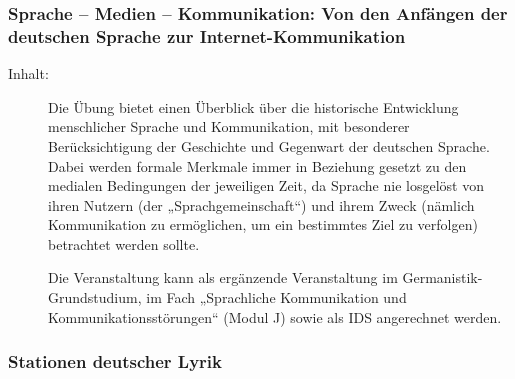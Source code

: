 \documentclass[%
a4paper, %
11pt,               %
leqno,              %
fleqn,              %
]
{scrartcl}
\begin{document}

\subsubsection{Sprache -- Medien -- Kommunikation: Von den Anfängen der
deutschen Sprache zur Internet-Kommunikation} %
\label{ssub:Sprache -- Medien -- Kommunikation: Von den Anfängen der deutschen
Sprache zur Internet-Kommunikation}

\begin{description}
  \item[Inhalt:] Die Übung bietet einen Überblick über die historische
    Entwicklung menschlicher Sprache und Kommunikation, mit besonderer
    Berücksichtigung der Geschichte und Gegenwart der deutschen Sprache. Dabei
    werden formale Merkmale immer in Beziehung gesetzt zu den medialen
    Bedingungen der jeweiligen Zeit, da Sprache nie losgelöst von ihren Nutzern
    (der „Sprachgemeinschaft“) und ihrem Zweck (nämlich Kommunikation zu
    ermöglichen, um ein bestimmtes Ziel zu verfolgen) betrachtet werden sollte.

    Die Veranstaltung kann als ergänzende Veranstaltung im
    Germanistik-Grundstudium, im Fach „Sprachliche Kommunikation und
    Kommunikationsstörungen“ (Modul J) sowie als IDS angerechnet werden.
\end{description}


\subsubsection{Stationen deutscher Lyrik} %
\label{ssub:Stationen deutscher Lyrik}
\end{document}
